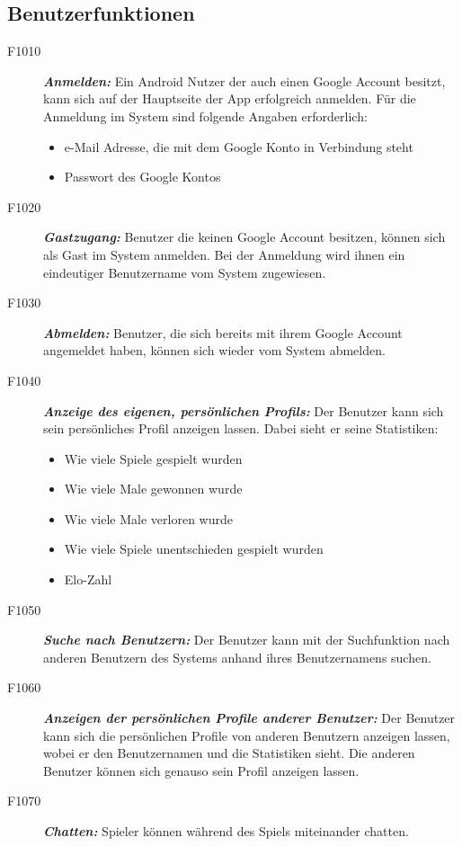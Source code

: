 \documentclass[parskip=full]{scrartcl}
\begin{document}
\subsection{Benutzerfunktionen}
\begin{description}
	\item[F1010] \textbf{\textit{Anmelden: }} Ein \gls{Android} Nutzer der auch einen Google Account besitzt, kann sich auf der Hauptseite der App erfolgreich anmelden. Für die Anmeldung im System sind folgende Angaben erforderlich:
	\begin{itemize}
		\item e-Mail Adresse, die mit dem Google Konto in Verbindung steht
		\item Passwort des Google Kontos
	\end{itemize}  
	\item[F1020] \textbf{\textit{Gastzugang: }} Benutzer die keinen Google Account besitzen, können sich als Gast im System anmelden. Bei der Anmeldung wird ihnen ein eindeutiger Benutzername vom System zugewiesen. 
	\item[F1030] \textbf{\textit{Abmelden: }} Benutzer, die sich bereits mit ihrem Google Account angemeldet haben, können sich wieder vom System abmelden.
	
	\item [F1040] \textbf{\textit{Anzeige des eigenen, persönlichen Profils: }}  Der Benutzer kann sich sein persönliches Profil anzeigen lassen. Dabei sieht er seine Statistiken:
	
	\begin{itemize}
		\item Wie viele Spiele gespielt wurden
		\item Wie viele Male gewonnen wurde
		\item Wie viele Male verloren wurde
		\item Wie viele Spiele unentschieden gespielt wurden
		\item Elo-Zahl
		
	\end{itemize}
	\item[F1050] \textbf{\textit{Suche nach Benutzern: }} Der Benutzer kann mit der Suchfunktion nach anderen Benutzern des Systems anhand ihres Benutzernamens suchen.
	
	\item[F1060]  \textbf{\textit{Anzeigen der persönlichen Profile anderer Benutzer: }}
	Der Benutzer kann sich die persönlichen Profile von anderen Benutzern anzeigen lassen, wobei er den Benutzernamen und die Statistiken sieht. Die anderen Benutzer können sich genauso sein Profil anzeigen lassen.
	\item[F1070] \textbf{\textit{Chatten: }} Spieler können während des Spiels miteinander chatten.	
	
\end{description}
\end{document}
